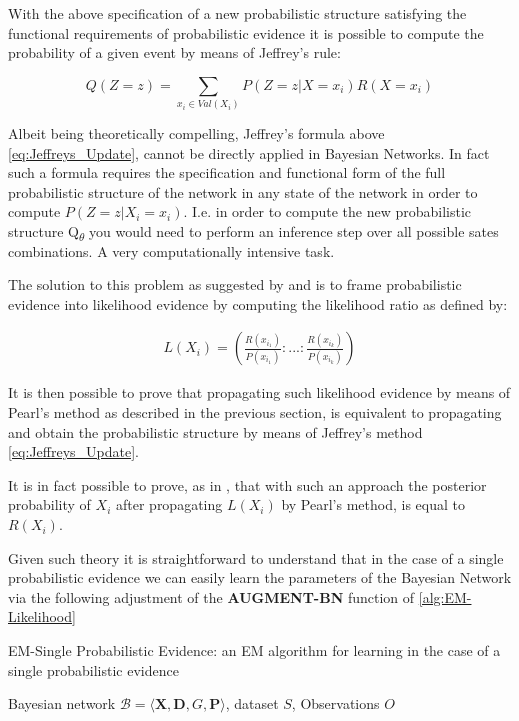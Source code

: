 \documentclass[11pt]{article}
\begin{document}
\begin{article}
With the above specification of a new probabilistic structure
satisfying the functional requirements of probabilistic evidence it
is possible to compute the probability of a given event by means of
Jeffrey's rule:

\begin{equation} \label{eq:Jeffreys_Update}
 Q(Z = z) = \sum_{x_i \in Val(X_i)} P(Z = z | X = x_i) R(X = x_i)
\end{equation}

Albeit being theoretically compelling, Jeffrey's formula above
\ref{eq:Jeffreys_Update}, cannot be directly applied in Bayesian
Networks. In fact such a formula requires the specification and
functional form of the full probabilistic structure of the network
in any state of the network in order to compute \(P(Z = z | X_i =
  x_i)\). I.e. in order to compute the new probabilistic structure
Q\textsubscript{\(\theta\)} you would need to perform an inference step over all
possible sates combinations. A very computationally intensive task.

The solution to this problem as suggested by \cite{Chan_2005} and
\cite{PENG_2010} is to frame probabilistic evidence into likelihood
evidence by computing the likelihood ratio as defined by:

\begin{align} \label{eq:probabilistic-to-likelihood-evidence}
 L(X_i) = (\frac{R(x_{i_1})}{P(x_{i_1})}: ... : \frac{R(x_{i_k})}{P(x_{i_k})})
\end{align}

It is then possible to prove that propagating such likelihood
evidence by means of Pearl's method as described in the previous
section, is equivalent to propagating and obtain the probabilistic
structure by means of Jeffrey's method \ref{eq:Jeffreys_Update}.

It is in fact possible to prove, as in \cite{PENG_2010}, that with
such an approach the posterior probability of \(X_i\) after propagating
\(L(X_i)\) by Pearl’s method, is equal to \(R(X_i)\).

Given such theory it is straightforward to understand that
in the case of a single probabilistic evidence we can easily learn
the parameters of the Bayesian Network via the following adjustment
of the \textbf{AUGMENT-BN} function of \ref{alg:EM-Likelihood}

\algrenewcommand\algorithmicindent{1.5em}%

\begin{algorithm*}[h!]
\caption{EM-Single Probabilistic Evidence: an EM algorithm for learning in the case of a single probabilistic evidence}
\label{alg:EM-Probabilistic-Evidence}
\vspace{-10pt}
\begin{multicols}{2}
\begin{algorithmic}[1] 
\Require Bayesian network $\mathcal{B}=\langle \mathbf{X},\mathbf{D}, G, \mathbf{P} \rangle$, dataset $S$, Observations $O$


\end{algorithmic}
\end{multicols}
\end{algorithm*}
\end{article}
\end{document}
